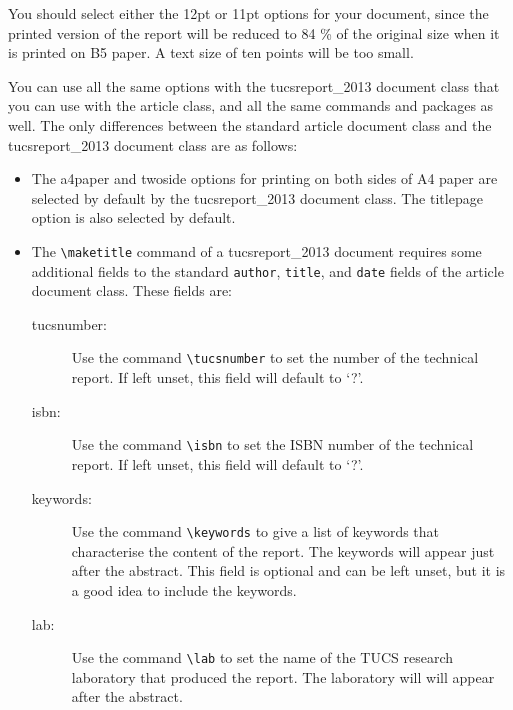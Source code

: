 \documentclass[12pt]{tucsreport_2013}
\begin{document}
    You should select either the \textsf{12pt} or \textsf{11pt} options for
    your document, since the printed version of the report will be reduced to
    84 \% of the original size when it is printed on B5 paper. A text size of
    ten points will be too small.

    You can use all the same options with the \textsf{tucsreport\_2013} document
      class that you can use with the \textsf{article} class, and all the same
      commands and packages as well. The only differences between the
      standard \textsf{article} document class and the \textsf{tucsreport\_2013}
      document class are as follows:

    \begin{itemize}
      \item
	The \textsf{a4paper} and \textsf{twoside} options for printing on both sides
	of A4 paper are selected by default by the \textsf{tucsreport\_2013} document
	class. The \textsf{titlepage} option is also selected by default.
      \item
	The \verb"\maketitle" command of a \textsf{tucsreport\_2013} document
	  requires some additional fields to the standard \texttt{author}, \texttt{title},
	  and \texttt{date} fields of the \textsf{article} document class. These fields are:
	
	\begin{description}
	  \item[tucsnumber:]
	    Use the command \verb"\tucsnumber" to set the number of the technical
	    report. If left unset, this field will default to `?'.
	  \item[isbn:]
	    Use the command \verb"\isbn" to set the ISBN number of the technical
	    report. If left unset, this field will default to `?'.
	  \item[keywords:]
	    Use the command \verb"\keywords" to give a list of keywords that
	    characterise the content of the report. The keywords will appear just after
	    the abstract. This field is optional and can be left unset, but it is a good idea
	    to include the keywords.
	  \item[lab:]
	    Use the command \verb"\lab" to set the name of the TUCS  research
	    laboratory that produced the report. The laboratory will will appear after
	    the abstract.
	\end{description}
	

\end{itemize}
\end{document}
